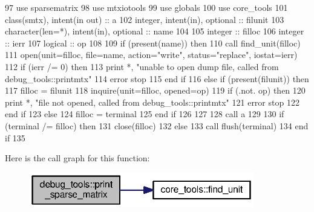 \begin{DoxyCode}
97       \textcolor{keywordtype}{use }sparsematrix
98       \textcolor{keywordtype}{use }mtxiotools
99       \textcolor{keywordtype}{use }globals
100       \textcolor{keywordtype}{use }core_tools
101       \textcolor{keywordtype}{class}(smtx), \textcolor{keywordtype}{intent(in out)} :: a
102       \textcolor{keywordtype}{integer}, \textcolor{keywordtype}{intent(in)}, \textcolor{keywordtype}{optional} :: filunit
103       \textcolor{keywordtype}{character(len=*)}, \textcolor{keywordtype}{intent(in)}, \textcolor{keywordtype}{optional} :: name
104 
105       \textcolor{keywordtype}{integer} :: filloc
106       \textcolor{keywordtype}{integer} :: ierr
107       \textcolor{keywordtype}{logical} :: op
108       
109       \textcolor{keywordflow}{if} (\textcolor{keyword}{present}(name)) \textcolor{keywordflow}{then}
110         \textcolor{keyword}{call }find_unit(filloc)
111         \textcolor{keyword}{open}(unit=filloc, file=name, action=\textcolor{stringliteral}{"write"}, status=\textcolor{stringliteral}{"replace"}, iostat\textcolor{comment}{=ierr)}
112 \textcolor{comment}{        }\textcolor{keywordflow}{if} (ierr /= 0) \textcolor{keywordflow}{then}
113           print *, \textcolor{stringliteral}{"unable to open dump file, called from debug\_tools::printmtx"}
114           error stop
115 \textcolor{keywordflow}{        end if}
116       \textcolor{keywordflow}{else} \textcolor{keywordflow}{if} (\textcolor{keyword}{present}(filunit)) \textcolor{keywordflow}{then}
117         filloc = filunit
118         \textcolor{keyword}{inquire}(unit=filloc, opened=op)
119         \textcolor{keywordflow}{if} (.not. op) \textcolor{keywordflow}{then}
120           print *, \textcolor{stringliteral}{"file not opened, called from debug\_tools::printmtx"}
121           error stop
122 \textcolor{keywordflow}{        end if}
123       \textcolor{keywordflow}{else}
124         filloc = terminal
125 \textcolor{keywordflow}{      end if}
126       
127 
128       \textcolor{keyword}{call }a%
129 
130       \textcolor{keywordflow}{if} (terminal /= filloc) \textcolor{keywordflow}{then}
131         \textcolor{keyword}{close}(filloc)
132       \textcolor{keywordflow}{else}
133         \textcolor{keyword}{call }flush(terminal)
134 \textcolor{keywordflow}{      end if}
135 
\end{DoxyCode}


Here is the call graph for this function\+:\nopagebreak
\begin{figure}[H]
\begin{center}
\leavevmode
\includegraphics[width=278pt]{namespacedebug__tools_ae4fe3294b83f6728e4fc320f418317da_cgraph}
\end{center}
\end{figure}


